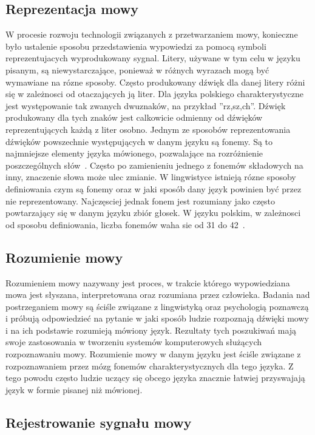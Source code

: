\documentclass[a4paper,12 pt]{report}
\begin{document}
\subsection{Reprezentacja mowy}
W procesie rozwoju technologii związanych z  przetwarzaniem mowy, konieczne było ustalenie sposobu przedstawienia wypowiedzi za pomocą symboli reprezentujacych wyprodukowany sygnal. Litery, używane w tym celu w języku pisanym, są niewystarczające, ponieważ w różnych wyrazach mogą być wymawiane na rózne sposoby.  Często produkowany dźwięk dla danej litery różni się w zależnosci od otaczających ją liter. Dla języka polskiego charakterystyczne jest występowanie tak zwanych dwuznaków, na przykład ''rz,sz,ch''. Dźwięk produkowany dla tych znaków jest calkowicie odmienny od dźwięków reprezentujących każdą z liter osobno. 
Jednym ze sposobów reprezentowania dźwięków powszechnie występujących w danym języku są fonemy. Są to najmniejsze elementy języka mówionego, pozwalające na rozróżnienie poszczególnych słów~\cite{phonem}. Często po zamienieniu jednego z fonemów składowych na inny, znaczenie słowa może ulec zmianie. W lingwistyce istnieją rózne sposoby definiowania czym są fonemy oraz w jaki sposób dany język powinien być przez nie reprezentowany. Najczęsciej jednak fonem jest rozumiany jako często powtarzający się w danym języku zbiór głosek. W języku polskim, w zależnosci od sposobu definiowania, liczba fonemów waha sie od 31 do 42~\cite{liczba_fonem}.
\subsection{Rozumienie mowy}
Rozumieniem mowy nazywany jest proces, w trakcie którego wypowiedziana mowa jest słyszana, interpretowana oraz rozumiana przez człowieka. Badania nad postrzeganiem mowy są ściśle związane
z lingwistyką oraz psychologią poznawczą i próbują odpowiedzieć na pytanie w jaki sposób ludzie rozpoznają dźwięki mowy i na ich podstawie rozumieją mówiony język. Rezultaty tych poszukiwań mają swoje zastosowania w tworzeniu systemów komputerowych służących rozpoznawaniu mowy. Rozumienie mowy w danym języku jest ściśle związane z rozpoznawaniem przez mózg fonemów charakterystycznych dla tego języka. Z tego powodu często ludzie uczący się obcego języka znacznie łatwiej przyswajają język w formie pisanej niż mówionej.
\subsection{Rejestrowanie sygnału mowy}
\end{document}
